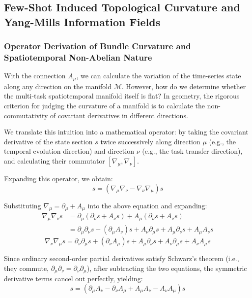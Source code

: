 \documentclass{article}
\begin{document}
\subsection{Few-Shot Induced Topological Curvature and Yang-Mills Information Fields}

\subsubsection{Operator Derivation of Bundle Curvature and Spatiotemporal Non-Abelian Nature}

With the connection $A_\mu$, we can calculate the variation of the time-series state along any direction on the manifold $\mathcal{M}$. However, how do we determine whether the multi-task spatiotemporal manifold itself is flat? In geometry, the rigorous criterion for judging the curvature of a manifold is to calculate the non-commutativity of covariant derivatives in different directions.

We translate this intuition into a mathematical operator: by taking the covariant derivative of the state section $s$ twice successively along direction $\mu$ (e.g., the temporal evolution direction) and direction $\nu$ (e.g., the task transfer direction), and calculating their commutator $[\nabla_\mu, \nabla_\nu]$.

Expanding this operator, we obtain:
\begin{equation}
[\nabla_\mu, \nabla_\nu]s = (\nabla_\mu \nabla_\nu - \nabla_\nu \nabla_\mu)s
\end{equation}

Substituting $\nabla_\mu = \partial_\mu + A_\mu$ into the above equation and expanding:
\begin{equation}
\begin{split}
\nabla_\mu \nabla_\nu s &= \partial_\mu(\partial_\nu s + A_\nu s) + A_\mu(\partial_\nu s + A_\nu s) \\
&= \partial_\mu \partial_\nu s + (\partial_\mu A_\nu)s + A_\nu \partial_\mu s + A_\mu \partial_\nu s + A_\mu A_\nu s
\end{split}
\end{equation}
\begin{equation}
\nabla_\nu \nabla_\mu s = \partial_\nu \partial_\mu s + (\partial_\nu A_\mu)s + A_\mu \partial_\nu s + A_\nu \partial_\mu s + A_\nu A_\mu s
\end{equation}

Since ordinary second-order partial derivatives satisfy Schwarz's theorem (i.e., they commute, $\partial_\mu \partial_\nu = \partial_\nu \partial_\mu$), after subtracting the two equations, the symmetric derivative terms cancel out perfectly, yielding:
\begin{equation}
[\nabla_\mu, \nabla_\nu]s = (\partial_\mu A_\nu - \partial_\nu A_\mu + A_\mu A_\nu - A_\nu A_\mu)s
\end{equation}
\end{document}
